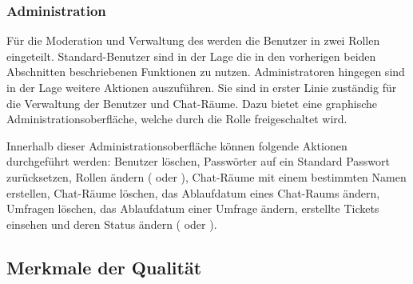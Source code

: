 \subsubsection{Administration}
Für die Moderation und Verwaltung des  werden die Benutzer in zwei Rollen eingeteilt.
Standard-Benutzer sind in der Lage die in den vorherigen beiden Abschnitten beschriebenen Funktionen zu nutzen.
Administratoren hingegen sind in der Lage weitere Aktionen auszuführen.
Sie sind in erster Linie zuständig für die Verwaltung der Benutzer und Chat-Räume.
Dazu bietet  eine graphische Administrationsoberfläche, welche durch die Rolle  freigeschaltet wird.

\noindent{}Innerhalb dieser Administrationsoberfläche können folgende Aktionen durchgeführt werden:
Benutzer löschen, Passwörter auf ein Standard Passwort zurücksetzen, Rollen ändern ( oder ), Chat-Räume mit einem bestimmten Namen erstellen, Chat-Räume löschen, das Ablaufdatum eines Chat-Raums ändern, Umfragen löschen, das Ablaufdatum einer Umfrage ändern, erstellte Tickets einsehen und deren Status ändern ( oder ).

\subsection{Merkmale der Qualität}\label{sec:ProduktUndGebrauchsqualitaet}
